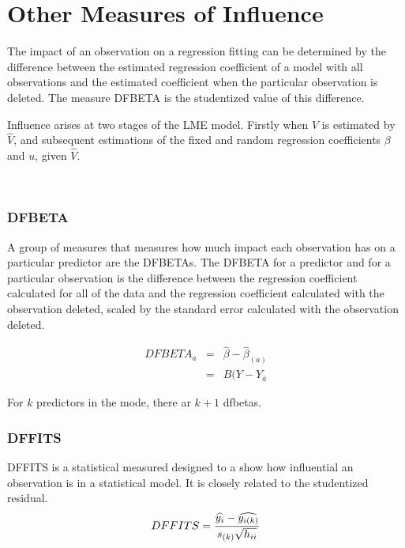 	
\section{Other Measures of Influence}
The impact of an observation on a regression fitting can be determined by the difference between the estimated regression coefficient of a model with all observations and the estimated coefficient when the particular observation is deleted. The measure DFBETA is the studentized value of this difference.

Influence arises at two stages of the LME model. Firstly when $V$ is estimated by $\hat{V}$, and subsequent
estimations of the fixed and random regression coefficients $\beta$ and $u$, given $\hat{V}$.

\

\subsubsection{DFBETA}
A group of measures that measures how much impact each observation has on a particular predictor are the DFBETAs. The DFBETA for a predictor and for a particular observation is the difference between the regression coefficient calculated for all of the data and the regression coefficient calculated with the observation deleted,  scaled by the standard error calculated with the observation deleted.

\begin{eqnarray}
DFBETA_{a} &=& \hat{\beta} - \hat{\beta}_{(a)} \\
&=& B(Y-Y_{\bar{a}}
\end{eqnarray}

For $k$ predictors in the mode, there ar $k+1$ dfbetas.



\subsubsection{DFFITS} %
DFFITS is a statistical measured designed to a show how influential an observation is in a statistical model. It is closely related to the studentized residual.
\begin{displaymath} DFFITS = {\widehat{y_i} -
	\widehat{y_{i(k)}} \over s_{(k)} \sqrt{h_{ii}}} \end{displaymath}


